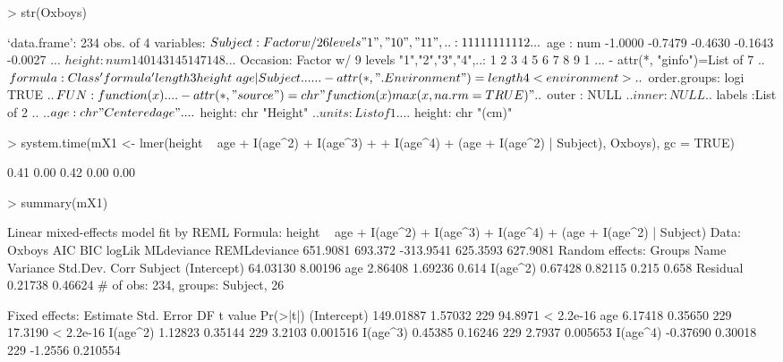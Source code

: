 \documentclass[12pt]{article}
\begin{document}
\begin{Schunk}
\begin{Sinput}
> str(Oxboys)
\end{Sinput}
\begin{Soutput}
`data.frame':	234 obs. of  4 variables:
 $ Subject : Factor w/ 26 levels "1","10","11",..: 1 1 1 1 1 1 1 1 1 12 ...
 $ age     : num  -1.0000 -0.7479 -0.4630 -0.1643 -0.0027 ...
 $ height  : num  140 143 145 147 148 ...
 $ Occasion: Factor w/ 9 levels "1","2","3","4",..: 1 2 3 4 5 6 7 8 9 1 ...
 - attr(*, "ginfo")=List of 7
  ..$ formula     :Class 'formula' length 3 height ~ age | Subject
  .. .. ..- attr(*, ".Environment")=length 4 <environment> 
  ..$ order.groups: logi TRUE
  ..$ FUN         :function (x)  
  .. ..- attr(*, "source")= chr "function (x) max(x, na.rm = TRUE)"
  ..$ outer       : NULL
  ..$ inner       : NULL
  ..$ labels      :List of 2
  .. ..$ age   : chr "Centered age"
  .. ..$ height: chr "Height"
  ..$ units       :List of 1
  .. ..$ height: chr "(cm)"
\end{Soutput}
\begin{Sinput}
> system.time(mX1 <- lmer(height ~ age + I(age^2) + I(age^3) + 
+     I(age^4) + (age + I(age^2) | Subject), Oxboys), gc = TRUE)
\end{Sinput}
\begin{Soutput}
[1] 0.41 0.00 0.42 0.00 0.00
\end{Soutput}
\begin{Sinput}
> summary(mX1)
\end{Sinput}
\begin{Soutput}
Linear mixed-effects model fit by REML
Formula: height ~ age + I(age^2) + I(age^3) + I(age^4) + (age + I(age^2) |      Subject) 
   Data: Oxboys 
      AIC     BIC    logLik MLdeviance REMLdeviance
 651.9081 693.372 -313.9541   625.3593     627.9081
Random effects:
 Groups   Name        Variance Std.Dev. Corr        
 Subject  (Intercept) 64.03130 8.00196              
          age          2.86408 1.69236  0.614       
          I(age^2)     0.67428 0.82115  0.215 0.658 
 Residual              0.21738 0.46624              
# of obs: 234, groups: Subject, 26

Fixed effects:
             Estimate Std. Error  DF t value  Pr(>|t|)
(Intercept) 149.01887    1.57032 229 94.8971 < 2.2e-16
age           6.17418    0.35650 229 17.3190 < 2.2e-16
I(age^2)      1.12823    0.35144 229  3.2103  0.001516
I(age^3)      0.45385    0.16246 229  2.7937  0.005653
I(age^4)     -0.37690    0.30018 229 -1.2556  0.210554


\end{Soutput}
\end{Schunk}
\end{document}
